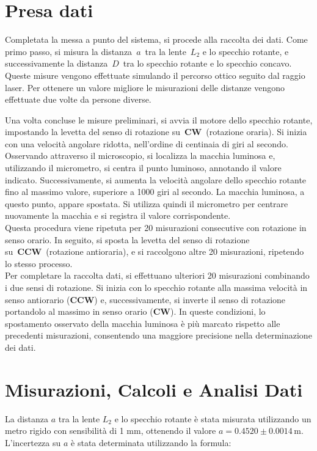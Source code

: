\documentclass{article}
\begin{document}
\section{Presa dati}
Completata la messa a punto del sistema, si procede alla raccolta dei dati. Come primo passo, si misura la distanza \(a\) tra la lente \(L_2\) e lo specchio rotante, e successivamente la distanza \(D\) tra lo specchio rotante e lo specchio concavo. Queste misure vengono effettuate simulando il percorso ottico seguito dal raggio laser. Per ottenere un valore migliore le misurazioni delle distanze vengono effettuate due volte da persone diverse.

Una volta concluse le misure preliminari, si avvia il motore dello specchio rotante, impostando la levetta del senso di rotazione su \textbf{CW} (rotazione oraria). Si inizia con una velocità angolare ridotta, nell’ordine di centinaia di giri al secondo. Osservando attraverso il microscopio, si localizza la macchia luminosa e, utilizzando il micrometro, si centra il punto luminoso, annotando il valore indicato. Successivamente, si aumenta la velocità angolare dello specchio rotante fino al massimo valore, superiore a 1000 giri al secondo. La macchia luminosa, a questo punto, appare spostata. Si utilizza quindi il micrometro per centrare nuovamente la macchia e si registra il valore corrispondente.\\
Questa procedura viene ripetuta per 20 misurazioni consecutive con rotazione in senso orario. In seguito, si sposta la levetta del senso di rotazione su \textbf{CCW} (rotazione antioraria), e si raccolgono altre 20 misurazioni, ripetendo lo stesso processo.\\
Per completare la raccolta dati, si effettuano ulteriori 20 misurazioni combinando i due sensi di rotazione. Si inizia con lo specchio rotante alla massima velocità in senso antiorario (\textbf{CCW}) e, successivamente, si inverte il senso di rotazione portandolo al massimo in senso orario (\textbf{CW}). In queste condizioni, lo spostamento osservato della macchia luminosa è più marcato rispetto alle precedenti misurazioni, consentendo una maggiore precisione nella determinazione dei dati.




\section{Misurazioni, Calcoli e Analisi Dati}

La distanza $a$ tra la lente \(L_2\) e lo specchio rotante è stata misurata utilizzando un metro rigido con sensibilità di 1 mm, ottenendo il valore \(a = 0.4520 \pm 0.0014 \, \text{m}\). 
L'incertezza su $a$ è stata determinata utilizzando la formula:
\end{document}
